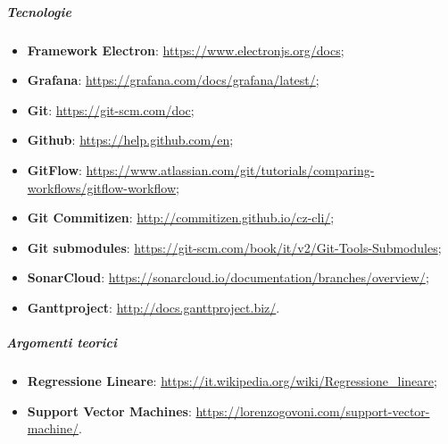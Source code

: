 \documentclass[../norme-di-progetto.tex]{subfiles}
\begin{document}
\subparagraph*{Tecnologie}
\begin{itemize}
  \item \textbf{Framework Electron}: \href{https://www.electronjs.org/docs}{https://www.electronjs.org/docs};
  \item \textbf{Grafana}: \href{https://grafana.com/docs/grafana/latest/}{https://grafana.com/docs/grafana/latest/};
  \item \textbf{Git}: \href{https://git-scm.com/doc}{https://git-scm.com/doc};
  \item \textbf{Github}: \href{https://help.github.com/en}{https://help.github.com/en};
  \item \textbf{GitFlow}: \href{https://www.atlassian.com/git/tutorials/comparing-workflows/gitflow-workflow}{https://www.atlassian.com/git/tutorials/comparing-workflows/gitflow-workflow};
  \item \textbf{Git Commitizen}: \href{http://commitizen.github.io/cz-cli/}{http://commitizen.github.io/cz-cli/};
  \item \textbf{Git submodules}: \href{https://git-scm.com/book/it/v2/Git-Tools-Submodules}{https://git-scm.com/book/it/v2/Git-Tools-Submodules};
  \item \textbf{SonarCloud}: \href{https://sonarcloud.io/documentation/branches/overview/}{https://sonarcloud.io/documentation/branches/overview/};
  \item \textbf{Ganttproject}: \href{http://docs.ganttproject.biz/}{http://docs.ganttproject.biz/}.
\end{itemize}

\subparagraph*{Argomenti teorici}
\begin{itemize}
  \item \textbf{Regressione Lineare}: \href{https://it.wikipedia.org/wiki/Regressione_lineare}{https://it.wikipedia.org/wiki/Regressione\_lineare};
  \item \textbf{Support Vector Machines}: \href{https://lorenzogovoni.com/support-vector-machine/}{https://lorenzogovoni.com/support-vector-machine/}.
\end{itemize}
\end{document}
